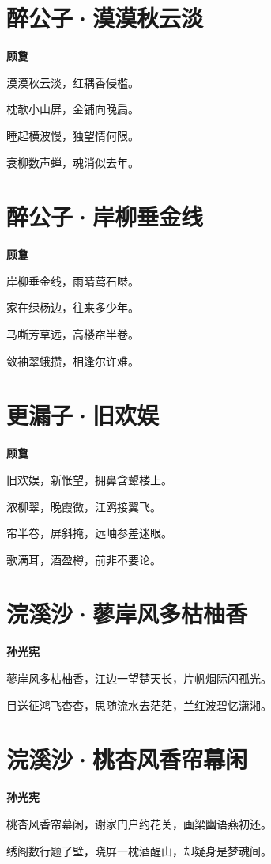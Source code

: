 \documentclass[12pt,a4paper]{ctexbook}
\begin{document}
\section{醉公子·漠漠秋云淡}
\textbf{顾敻}\par\vspace{0.5em}
漠漠秋云淡，红耦香侵槛。\par
枕欹小山屏，金铺向晚扃。\par
睡起横波慢，独望情何限。\par
衰柳数声蝉，魂消似去年。\par

\section{醉公子·岸柳垂金线}
\textbf{顾敻}\par\vspace{0.5em}
岸柳垂金线，雨晴莺石啭。\par
家在绿杨边，往来多少年。\par
马嘶芳草远，高楼帘半卷。\par
敛袖翠蛾攒，相逢尔许难。\par

\section{更漏子·旧欢娱}
\textbf{顾敻}\par\vspace{0.5em}
旧欢娱，新怅望，拥鼻含颦楼上。\par
浓柳翠，晚霞微，江鸥接翼飞。\par
帘半卷，屏斜掩，远岫参差迷眼。\par
歌满耳，酒盈樽，前非不要论。\par

\section{浣溪沙·蓼岸风多枯柚香}
\textbf{孙光宪}\par\vspace{0.5em}
蓼岸风多枯柚香，江边一望楚天长，片帆烟际闪孤光。\par
目送征鸿飞杳杳，思随流水去茫茫，兰红波碧忆潇湘。\par

\section{浣溪沙·桃杏风香帘幕闲}
\textbf{孙光宪}\par\vspace{0.5em}
桃杏风香帘幕闲，谢家门户约花关，画梁幽语燕初还。\par
绣阁数行题了壁，晓屏一枕酒醒山，却疑身是梦魂间。\par
\end{document}
